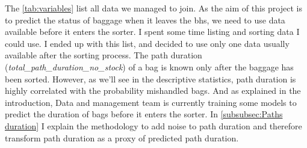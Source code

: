 \documentclass[12pt]{article}
\begin{document}
\indent The \autoref{tab:variables} list all data we managed to join. As the aim of this project is to predict the status of baggage when it leaves the \acrshort{bhs}, we need to use data available before it enters the sorter. I spent some time listing and sorting data I could use. I ended up with this list, and decided to use only one data usually available after the sorting process. The path duration (\textit{total\_path\_duration\_no\_stock}) of a bag is known only after the baggage has been sorted. However, as we'll see in the descriptive statistics, path duration is highly correlated with the probability mishandled bags. And as explained in the introduction, Data and management team is currently training some models to predict the duration of bags before it enters the sorter. In \autoref{subsubsec:Paths duration} I explain the methodology to add noise to path duration and therefore transform path duration as a proxy of predicted path duration.
\end{document}

